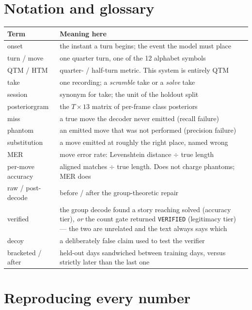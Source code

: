 \section{Notation and glossary}
\label{app:notation}

\begin{center}\small
\begin{tabular}{@{}lp{11.4cm}@{}}
\toprule
\textbf{Term} & \textbf{Meaning here} \\
\midrule
onset & the instant a turn begins; the event the model must place \\
turn / move & one quarter turn, one of the 12 alphabet symbols \\
QTM / HTM & quarter- / half-turn metric. This system is entirely QTM \\
take & one recording; a \emph{scramble} take or a \emph{solve} take \\
session & synonym for take; the unit of the holdout split \\
posteriorgram & the $T\times13$ matrix of per-frame class posteriors \\
miss & a true move the decoder never emitted (recall failure) \\
phantom & an emitted move that was not performed (precision failure) \\
substitution & a move emitted at roughly the right place, named wrong \\
MER & move error rate: Levenshtein distance $\div$ true length \\
per-move accuracy & aligned matches $\div$ true length. Does not charge
  phantoms; MER does \\
raw / post-decode & before / after the group-theoretic repair \\
verified & the group decode found a story reaching solved (accuracy tier),
  \emph{or} the count gate returned \texttt{VERIFIED} (legitimacy tier) ---
  the two are unrelated and the text always says which \\
decoy & a deliberately false claim used to test the verifier \\
bracketed / after & held-out days sandwiched between training days, versus
  strictly later than the last one \\
\bottomrule
\end{tabular}
\end{center}

\section{Reproducing every number}
\label{app:repro}

